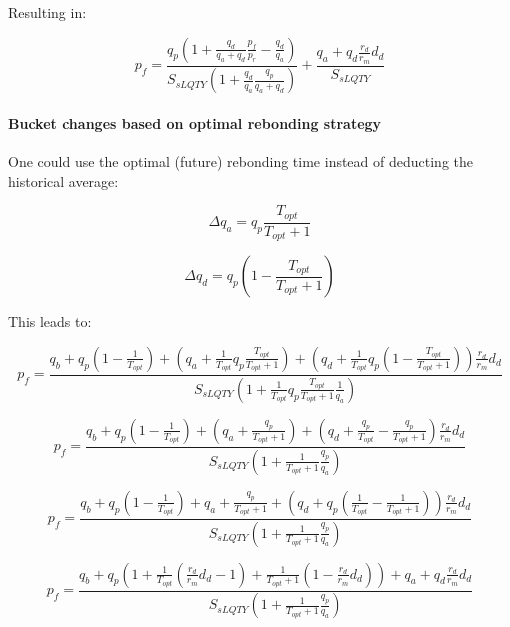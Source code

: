 \documentclass{article}
\begin{document}
Resulting in:

\begin{equation}
p_{f} = \frac{q_{p} \left(1+\frac{q_{d}}{q_{a}+q_{d}} \frac{p_{f}}{p_{r}}-\frac{q_{d}}{q_{a}}\right)}{S_{sLQTY} \left( 1+\frac{q_{d}}{q_{a}}\frac{q_{p}}{q_{a}+q_{d}} \right)} + \frac{q_{a}+q_{d}\frac{r_{d}}{r_{m}}d_{d}}{S_{sLQTY}}
\end{equation}

\paragraph{Bucket changes based on optimal rebonding strategy}
One could use the optimal (future) rebonding time instead of deducting the historical average:

\begin{equation}
\Delta q_{a} = q_{p} \frac{T_{opt}}{T_{opt}+1}
\end{equation}

\begin{equation}
\Delta q_{d} = q_{p} \left( 1- \frac{T_{opt}}{T_{opt}+1} \right)
\end{equation}

This leads to:

\[
p_{f} = \frac{q_{b}+q_{p} \left(1-\frac{1}{T_{opt}}\right)+\left(q_{a}+\frac{1}{T_{opt}} q_{p} \frac{T_{opt}}{T_{opt}+1}\right)+ \left(q_{d}+\frac{1}{T_{opt}} q_{p} \left( 1- \frac{T_{opt}}{T_{opt}+1}\right)\right)\frac{r_{d}}{r_{m}}d_{d}}{S_{sLQTY} \left( 1+\frac{1}{T_{opt}} q_{p} \frac{T_{opt}}{T_{opt}+1}\frac{1}{q_{a}} \right)}
\]

\[
p_{f} = \frac{q_{b}+q_{p} \left(1-\frac{1}{T_{opt}}\right)+\left(q_{a}+ \frac{q_{p}}{T_{opt}+1}\right)+ \left(q_{d}+\frac{q_{p}}{T_{opt}} - \frac{q_{p}}{T_{opt}+1}\right)\frac{r_{d}}{r_{m}}d_{d}}{S_{sLQTY} \left( 1+ \frac{1}{T_{opt}+1}\frac{q_{p}}{q_{a}} \right)}
\]

\[
p_{f} = \frac{q_{b}+q_{p}\left(1-\frac{1}{T_{opt}}\right)+q_{a}+ \frac{q_{p}}{T_{opt}+1}+\left(q_{d}+q_{p} \left( \frac{1}{T_{opt}}- \frac{1}{T_{opt}+1} \right)\right)\frac{r_{d}}{r_{m}}d_{d}}{S_{sLQTY}\left(1+  \frac{1}{T_{opt}+1}\frac{q_{p}}{q_{a}}\right)}
\]

\begin{equation}
  \label{eq:recursive_optimal_1}
p_{f} = \frac{q_{b}+q_{p} \left(1+\frac{1}{T_{opt}}\left(\frac{r_{d}}{r_{m}}d_{d}-1\right)+ \frac{1}{T_{opt}+1}\left( 1 - \frac{r_{d}}{r_{m}}d_{d} \right)\right)+q_{a}+q_{d}\frac{r_{d}}{r_{m}}d_{d}}{S_{sLQTY}\left(1+  \frac{1}{T_{opt}+1}\frac{q_{p}}{q_{a}}\right)}
\end{equation}
\end{document}

